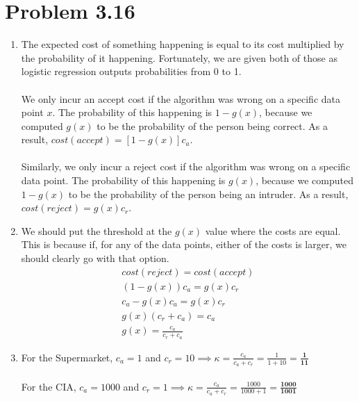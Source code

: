 \documentclass[12pt]{article}
\begin{document}
\section*{Problem 3.16}
\begin{enumerate}[label=(\alph*)]
	\item The expected cost of something happening is equal to its cost multiplied by the probability of it happening. Fortunately, we are given both of those as logistic regression outputs probabilities from 0 to 1.
	\\ \\ We only incur an accept cost if the algorithm was wrong on a specific data point $x$. The probability of this happening is $1 - g(x)$, because we computed $g(x)$ to be the probability of the person being correct. As a result, $cost(accept) = [1 - g(x)]c_a$.
	\\ \\ Similarly, we only incur a reject cost if the algorithm was wrong on a specific data point. The probability of this happening is $g(x)$, because we computed $1 - g(x)$ to be the probability of the person being an intruder. As a result, $cost(reject) = g(x)c_r$.
	\item We should put the threshold at the $g(x)$ value where the costs are equal. This is because if, for any of the data points, either of the costs is larger, we should clearly go with that option.
	\begin{gather*}
		cost(reject) = cost(accept)
		\\ (1 - g(x)) c_a = g(x) c_r
		\\ c_a - g(x) c_a = g(x) c_r
		\\ g(x) (c_r + c_a) = c_a
		\\ g(x) = \frac{c_a}{c_r + c_a}
	\end{gather*}
	\item For the Supermarket, $c_a = 1$ and $c_r = 10 \implies \kappa = \frac{c_a}{c_a + c_r} = \frac{1}{1 + 10} = \boldsymbol{\frac{1}{11}}$
	\\ \\ For the CIA, $c_a = 1000$ and $c_r = 1 \implies \kappa = \frac{c_a}{c_a + c_r} = \frac{1000}{1000 + 1} = \boldsymbol{\frac{1000}{1001}}$
\end{enumerate}
\end{document}
